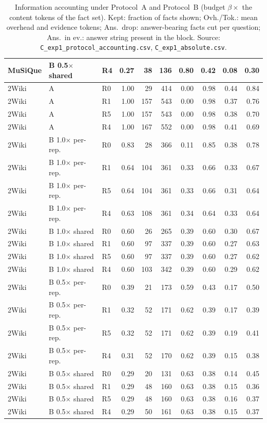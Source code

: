 \begin{table}[t]
\begin{tabular}{@{}lllrrrrrrr@{}}
MuSiQue & B 0.5$\times$ shared & R4 & 0.27 & 38 & 136 & 0.80 & 0.42 & 0.08 & 0.30 \\
\midrule
2Wiki & A & R0 & 1.00 & 29 & 414 & 0.00 & 0.98 & 0.44 & 0.84 \\
2Wiki & A & R1 & 1.00 & 157 & 543 & 0.00 & 0.98 & 0.37 & 0.76 \\
2Wiki & A & R5 & 1.00 & 157 & 543 & 0.00 & 0.98 & 0.38 & 0.70 \\
2Wiki & A & R4 & 1.00 & 167 & 552 & 0.00 & 0.98 & 0.41 & 0.69 \\
2Wiki & B 1.0$\times$ per-rep. & R0 & 0.83 & 28 & 366 & 0.11 & 0.85 & 0.38 & 0.78 \\
2Wiki & B 1.0$\times$ per-rep. & R1 & 0.64 & 104 & 361 & 0.33 & 0.66 & 0.33 & 0.67 \\
2Wiki & B 1.0$\times$ per-rep. & R5 & 0.64 & 104 & 361 & 0.33 & 0.66 & 0.31 & 0.64 \\
2Wiki & B 1.0$\times$ per-rep. & R4 & 0.63 & 108 & 361 & 0.34 & 0.64 & 0.33 & 0.64 \\
2Wiki & B 1.0$\times$ shared & R0 & 0.60 & 26 & 265 & 0.39 & 0.60 & 0.30 & 0.67 \\
2Wiki & B 1.0$\times$ shared & R1 & 0.60 & 97 & 337 & 0.39 & 0.60 & 0.27 & 0.63 \\
2Wiki & B 1.0$\times$ shared & R5 & 0.60 & 97 & 337 & 0.39 & 0.60 & 0.27 & 0.62 \\
2Wiki & B 1.0$\times$ shared & R4 & 0.60 & 103 & 342 & 0.39 & 0.60 & 0.29 & 0.62 \\
2Wiki & B 0.5$\times$ per-rep. & R0 & 0.39 & 21 & 173 & 0.59 & 0.43 & 0.17 & 0.50 \\
2Wiki & B 0.5$\times$ per-rep. & R1 & 0.32 & 52 & 171 & 0.62 & 0.39 & 0.17 & 0.39 \\
2Wiki & B 0.5$\times$ per-rep. & R5 & 0.32 & 52 & 171 & 0.62 & 0.39 & 0.19 & 0.41 \\
2Wiki & B 0.5$\times$ per-rep. & R4 & 0.31 & 52 & 170 & 0.62 & 0.39 & 0.15 & 0.38 \\
2Wiki & B 0.5$\times$ shared & R0 & 0.29 & 20 & 131 & 0.63 & 0.38 & 0.14 & 0.45 \\
2Wiki & B 0.5$\times$ shared & R1 & 0.29 & 48 & 160 & 0.63 & 0.38 & 0.15 & 0.36 \\
2Wiki & B 0.5$\times$ shared & R5 & 0.29 & 48 & 160 & 0.63 & 0.38 & 0.16 & 0.37 \\
2Wiki & B 0.5$\times$ shared & R4 & 0.29 & 50 & 161 & 0.63 & 0.38 & 0.15 & 0.37 \\
\bottomrule
\end{tabular}
\caption{Information accounting under Protocol~A and Protocol~B (budget $\beta\times$ the content tokens of the fact set). Kept: fraction of facts shown; Ovh./Tok.: mean overhead and evidence tokens; Ans.\ drop: answer-bearing facts cut per question; Ans.\ in ev.: answer string present in the block. Source: \texttt{C\_exp1\_protocol\_accounting.csv}, \texttt{C\_exp1\_absolute.csv}.}
\label{tab:budget}
\end{table}
